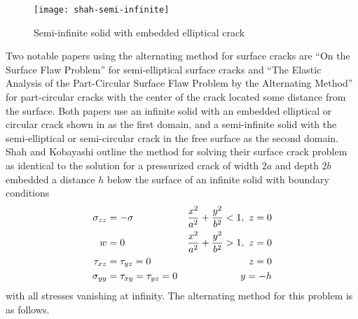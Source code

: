 \begin{figure}[tbp]
\centering
\texttt{[image: shah-semi-infinite]}
\caption[Semi-infinite solid with embedded elliptical crack]{Semi-infinite solid with embedded elliptical crack \citep{shahkobayashi1972}\label{fig:shah-semi-infinite}}
\end{figure}

Two notable papers using the alternating method for surface cracks are ``On the Surface Flaw Problem'' \citep{shahkobayashi1972} for semi-ellip\-ti\-cal surface cracks and ``The Elastic Analysis of the Part-Cir\-cular Surface Flaw Problem by the Alternating Method'' \citep{smith1972} for part-cir\-cu\-lar cracks with the center of the crack located some distance from the surface.
Both papers use an infinite solid with an embedded elliptical or circular crack shown in  as the first domain, and a semi-infi\-nite solid with the semi-ellip\-ti\-cal or semi-cir\-cu\-lar crack in the free surface as the second domain.
Shah and Kobayashi outline the method for solving their surface crack problem as identical to the solution for a pressurized crack of width \(2a\) and depth \(2b\) embedded a distance \(h\) below the surface of an infinite solid with boundary conditions
\begin{align}
\sigma_{zz} &= -\sigma & \frac{x^2}{a^2} + \frac{y^2}{b^2} < 1, ~ z=0 \label{eq:pressure} \\
w &= 0 & \frac{x^2}{a^2} + \frac{y^2}{b^2} > 1, ~ z=0 \label{eq:symmetry-displ} \\
\tau_{xz} &= \tau_{yz} = 0 & z=0 \label{eq:symmetry-stress} \\
\sigma_{yy} &= \tau_{xy} = \tau_{yz} = 0 & y=-h \label{eq:free-surface}
\end{align}
with all stresses vanishing at infinity.
The alternating method for this problem is as follows.
